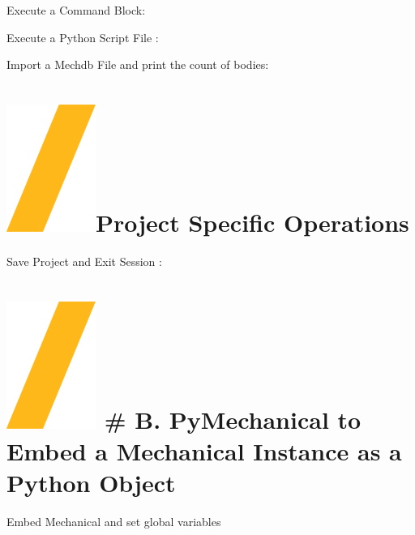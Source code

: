 \documentclass[9pt,landscape]{article}
\begin{document}
\begin{multicols}{3}

Execute a Command Block:


Execute a Python Script File :


Import a Mechdb File and print the count of bodies: 



\vfill
\section{\includegraphics[height=\fontcharht\font`\S]{slash.png}Project Specific Operations}
Save Project and Exit Session :


\section{\includegraphics[height=\fontcharht\font`\S]{slash.png} # B. PyMechanical to Embed a Mechanical Instance as a Python Object}
\vspace{5mm} %

Embed Mechanical and set global variables



\end{multicols}
\end{document}

